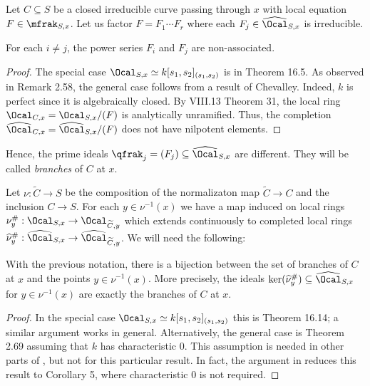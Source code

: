  Let $C\subseteq S$ be a closed irreducible curve passing through $x$ with local equation $F\in \mfrak_{S,x}$. Let us factor $F=F_1\cdots F_r$ where each $F_j\in \widehat{\Ocal}_{S,x}$ is irreducible.
\begin{lemma}
\notready For each $i\ne j$, the power series $F_i$ and $F_j$ are non-associated.
\end{lemma}
\begin{proof} The special case $\Ocal_{S,x}\simeq k[s_1,s_2]_{(s_1,s_2)}$ is in \cite{KunzBranches}  Theorem 16.5.  As observed in \cite{GFthesis} Remark 2.58, the general case follows from a result of Chevalley. Indeed, $k$ is perfect since it is algebraically closed. By \cite{ZariskiSamuel2} VIII.13 Theorem 31, the local ring $\Ocal_{C,x}=\Ocal_{S,x}/(F)$ is analytically unramified. Thus, the completion $\widehat{\Ocal}_{C,x} = \widehat{\Ocal}_{S,x}/(F)$ does not have nilpotent elements.
\end{proof}
Hence, the prime ideals $\qfrak_j=(F_j)\subseteq \widehat{\Ocal}_{S,x}$ are different. They will be called \emph{branches} of $C$ at $x$.

Let $\nu: \widetilde{C}\to S$ be the composition of the normalizaton map $\widetilde{C}\to C$ and the inclusion $C\to S$. For each $y\in \nu^{-1}(x)$ we have a map induced on local rings $\nu^\#_y: \Ocal_{S,x}\to \Ocal_{\widetilde{C},y}$ which extends continuously to completed local rings $\widehat{\nu}^\#_y: \widehat{\Ocal}_{S,x}\to \widehat{\Ocal}_{\widetilde{C},y}$. We will need the following:

\begin{lemma}
\notready \label{LemmaBranches} With the previous notation, there is a bijection between the set of branches of $C$ at $x$ and the points $y\in \nu^{-1}(x)$. More precisely, the ideals $\ker(\widehat{\nu}^\#_y)\subseteq \widehat{\Ocal}_{S,x}$ for $y\in \nu^{-1}(x)$ are exactly the branches of $C$ at $x$.
\end{lemma}
\begin{proof} In the special case $\Ocal_{S,x}\simeq k[s_1,s_2]_{(s_1,s_2)}$ this is \cite{KunzBranches} Theorem 16.14; a similar argument works in general. Alternatively, the general case is \cite{GFthesis} Theorem 2.69 assuming that $k$ has characteristic $0$. This assumption is needed in other parts of \cite{GFthesis}, but not  for this particular result. In fact, the argument in \cite{GFthesis} reduces this result to \cite{DKatz} Corollary 5, where characteristic $0$ is not required.
\end{proof}

